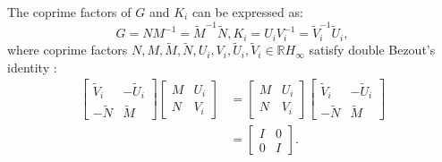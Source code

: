 \documentclass[journal]{IEEEtran}
\begin{document}
The coprime factors of $G$ and $K_i$ can be expressed as:
\begin{equation}
  G=N M^{-1}=\tilde{M}^{-1} \tilde{N}, K_{i}=U_{i} V_{i}^{-1}=\tilde{V}_{i}^{-1} \tilde{U}_{i},
\end{equation}
where coprime factors $N, M, \tilde{M}, \tilde{N}, U_{i}, V_{i}, \tilde{U}_{i}, \tilde{V}_{i} \in \mathbb{R} H_{\infty}$ satisfy double Bezout's identity \citep{pommaret1998generalized}:
\begin{equation}
  \begin{aligned}
    \left[\begin{array}{cc}
        \tilde{V}_{i} & -\tilde{U}_{i} \\
        -\tilde{N}    & \tilde{M}
      \end{array}\right]\left[\begin{array}{cc}
        M & U_{i} \\
        N & V_{i}
      \end{array}\right]
     & =\left[\begin{array}{cc}
        M & U_{i} \\
        N & V_{i}
      \end{array}\right]\left[\begin{array}{cc}
        \tilde{V}_{i} & -\tilde{U}_{i} \\
        -\tilde{N}    & \tilde{M}
      \end{array}\right] \\
     & =\left[\begin{array}{cc}
        I & 0 \\
        0 & I
      \end{array}\right].
  \end{aligned}
  \label{Eq16}
\end{equation}
\end{document}
